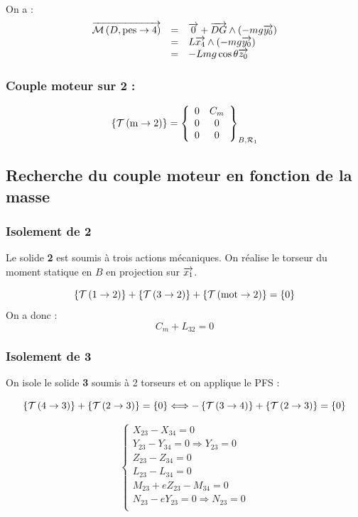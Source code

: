 \documentclass[10pt,fleqn]{article} %
\begin{document}


On a :
$$
\begin{array}{lcl}
\vectm{D}{\text{pes}}{4} &=& \vect{0} + \vect{DG} \wedge \left( -mg\vect{y_0}\right) \\
&=& L\vect{x_4} \wedge \left( -mg\vect{y_0}\right) \\
&=& -Lmg \cos \theta \vect{z_0} \\
\end{array}
$$


\subsubsection*{Couple moteur sur 2 :}
$$
\torseurstat{T}{\text{m}}{2}=\torseurcol{0}{0}{0}{C_m}{0}{0}{B,\mathcal{R}_1}
$$

\subsection{Recherche du couple moteur en fonction de la masse}
\subsubsection*{Isolement de 2}
Le solide \textbf{2} est soumis à trois actions mécaniques. On réalise le torseur du moment statique en $B$ en projection sur $\vect{x_1}$. 

$$
\torseurstat{T}{1}{2} + \torseurstat{T}{3}{2} + \torseurstat{T}{\text{mot}}{2}  =\{0\} 
$$
On a donc : 
$$
C_m + L_{32}=0
$$





\subsubsection*{Isolement de 3}
On isole le solide \textbf{3} soumis à 2 torseurs et on applique le PFS :

$$
\torseurstat{T}{4}{3} + \torseurstat{T}{2}{3} =\{0\} \Longleftrightarrow 
-\torseurstat{T}{3}{4} + \torseurstat{T}{2}{3} =\{0\} 
$$

$$
\left\{
\begin{array}{l}
X_{23} - X_{34}=0\\
Y_{23} - Y_{34}=0 \Rightarrow  Y_{23} = 0\\
Z_{23} - Z_{34}=0\\
L_{23} - L_{34}=0\\
M_{23}+eZ_{23} - M_{34} =0\\
N_{23}-eY_{23} =0 \Rightarrow  N_{23} = 0 \\
\end{array}
\right.
$$
\end{document}
